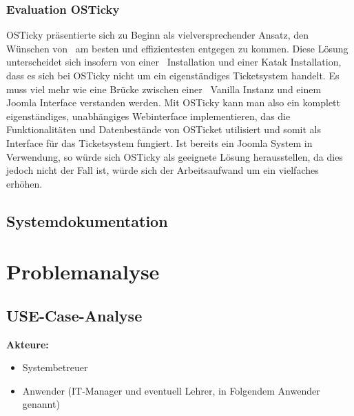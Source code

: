 \subsection{Evaluation OSTicky}
OSTicky präsentierte sich zu Beginn als vielversprechender Ansatz, den Wünschen von \getHammerl\ am besten und effizientesten entgegen zu kommen.
\newline Diese Lösung unterscheidet sich insofern von einer \getOst\ Installation und einer Katak Installation, dass es sich bei OSTicky nicht um ein eigenständiges Ticketsystem handelt. Es muss viel mehr wie eine Brücke zwischen einer \getOst\ Vanilla Instanz und einem Joomla Interface verstanden werden. Mit OSTicky kann man also ein komplett eigenständiges, unabhängiges Webinterface implementieren, das die Funktionalitäten und Datenbestände von OSTicket utilisiert und somit als Interface für das Ticketsystem fungiert. \newline Ist bereits ein Joomla System in Verwendung, so würde sich OSTicky als geeignete Lösung herausstellen, da dies jedoch nicht der Fall ist, würde sich der Arbeitsaufwand um ein vielfaches erhöhen.


\section{Systemdokumentation}







\chapter{Problemanalyse}

\section{USE-Case-Analyse}
{\linespread{.5}
	\textbf{Akteure:}
	\begin{itemize}
		\item Systembetreuer
		\item Anwender (IT-Manager und eventuell Lehrer, in Folgendem Anwender genannt)
\end{itemize}}

